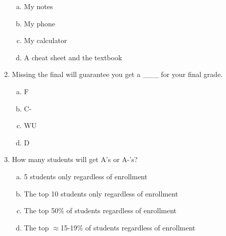 \documentclass[12pt]{article}
\begin{document}
\begin{enumerate}[1.]
\begin{enumerate}[(a)]
\item My notes
\item My phone
\item My calculator
\item A cheat sheet and the textbook
\end{enumerate}

\item Missing the final will guarantee you get a \_\_\_ for your final grade.

\begin{enumerate}[(a)]
\item F
\item C-
\item WU
\item D
\end{enumerate}

\item How many students will get A's or A-'s?

\begin{enumerate}[(a)]
\item 5 students only regardless of enrollment
\item The top 10 students only regardless of enrollment
\item The top 50\% of students regardless of enrollment
\item The top $\approx$15-19\% of students regardless of enrollment
\end{enumerate}


\end{enumerate}
\end{document}
